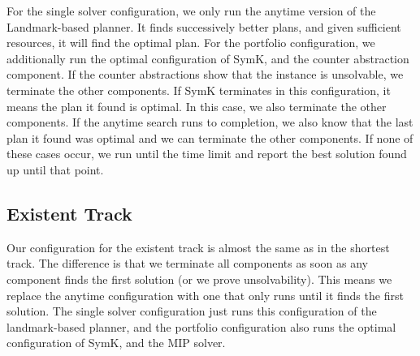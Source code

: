 \documentclass{article}
\begin{document}
For the single solver configuration, we only run the anytime version of the Landmark-based planner. It finds successively better plans, and given sufficient resources, it will find the optimal plan. For the portfolio configuration, we additionally run the optimal configuration of SymK, and the counter abstraction component. If the counter abstractions show that the instance is unsolvable, we terminate the other components. If SymK terminates in this configuration, it means the plan it found is optimal. In this case, we also terminate the other components. If the anytime search runs to completion, we also know that the last plan it found was optimal and we can terminate the other components. If none of these cases occur, we run until the time limit and report the best solution found up until that point.



\subsection{Existent Track}

Our configuration for the existent track is almost the same as in the shortest track. The difference is that we terminate all components as soon as any component finds the first solution (or we prove unsolvability). This means we replace the anytime configuration with one that only runs until it finds the first solution. The single solver configuration just runs this configuration of the landmark-based planner, and the portfolio configuration also runs the optimal configuration of SymK, and the MIP solver.
\end{document}
